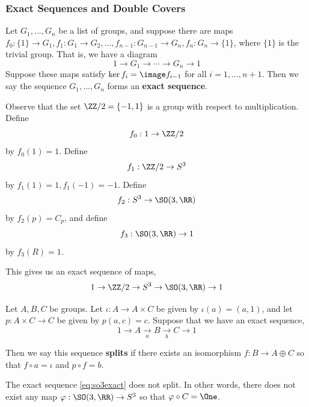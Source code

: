 \subsubsection{Exact Sequences and Double Covers}
\begin{defn}
Let $G_1,...,G_n$ be a list of groups, and suppose there are maps $f_0: \{1\} \to G_1, f_1 : G_1 \to G_2, ..., f_{n-1} : G_{n-1}\to G_n, f_n : G_n\to\{1\}$, where $\{1\}$ is the trivial group. That is, we have a diagram
\[1\to G_1\to\cdots \to G_n\to 1\]
Suppose these maps satisfy $\ker f_{i} = \image f_{i-1}$ for all $i=1,...,n+1$. Then we say the sequence $G_1,...,G_n$ forms an \textbf{exact sequence}.  
\end{defn}
\begin{example}
Observe that the set $\ZZ/2 = \{-1,1\}$ is a group with respect to multiplication.
Define \[f_0 : 1 \to \ZZ/2\] 
by $f_0(1) = 1$. Define
\[f_1 : \ZZ/2 \to S^3\] by $f_1(1) = 1, f_1(-1) = -1$. Define 
\[f_2 : S^3\to \SO(3,\RR)\] by $f_2(p) = C_p$, and define 
\[f_3 : \SO(3,\RR)\to 1\]
 by $f_3(R) = 1$. 

This gives us an exact sequence of maps,
\begin{equation}1\to \ZZ/2 \to S^3 \to \SO(3,\RR)\to 1\label{eq:so3exact}\end{equation}
\end{example}
\begin{defn}
Let $A,B,C$ be groups.
Let $\iota : A\to A\times C$ be given by $\iota(a)=(a,1)$, and let $p : A\times C \to C$ be given by $p(a,c) = c$. Suppose that we have an exact sequence,
\[1\to A\xrightarrow[a]{} B\xrightarrow[b]{} C \to 1\]

    Then we say this sequence \textbf{splits} if there exists an isomorphism $f : B\to A\oplus C$ so that $f\circ a = \iota$ and $p\circ f = b$. 
\end{defn}
\begin{thm}
The exact sequence \eqref{eq:so3exact} does not split. In other words, there does not exist any map $\varphi : \SO(3,\RR) \to S^3$ so that $\varphi \circ C = \One$.
\end{thm}
